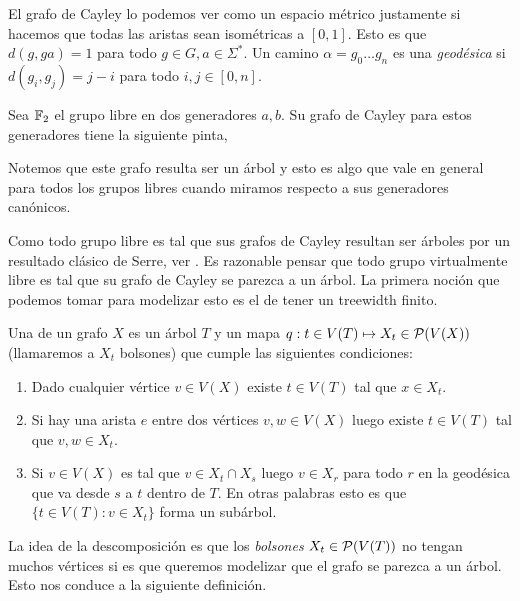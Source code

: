 \documentclass[tesis.tex]{subfiles}
\begin{document}
El grafo de Cayley lo podemos ver como un espacio métrico justamente si hacemos que todas las aristas sean isométricas a $[0,1]$. 
Esto es que $d(g,ga) = 1$ para todo $g \in G, a \in \Sigma^*$. 
Un camino $\alpha = g_0 \dots g_n$ es una \emph{geodésica} si $d(g_i,g_j) = j-i$ para todo $i,j \in [0,n]$.

\begin{ej}
	Sea $\Bbb F_2$ el grupo libre en dos generadores $a,b$. Su grafo de Cayley para estos generadores tiene la siguiente pinta,
	\bigskip
	
	
	 Notemos que este grafo resulta ser un árbol y esto es algo que vale en general para todos los grupos libres cuando miramos respecto a sus generadores canónicos.
\end{ej}

Como todo grupo libre es tal que sus grafos de Cayley resultan ser árboles por un resultado clásico de Serre, ver \cite{}.
Es razonable pensar que todo grupo virtualmente libre es tal que su grafo de Cayley se parezca a un árbol. 
La primera noción que podemos tomar para modelizar esto es el de tener un treewidth finito.

\begin{deff}\label{desc-arbol}
	 Una  de un grafo $X$ es un árbol $T$ y un mapa $q:t \in V(T) \mapsto X_t \in {\cal P}(V(X))$ (llamaremos a $X_t$ bolsones) que cumple las siguientes condiciones:
	\begin{enumerate}
		\item Dado cualquier vértice $v \in V(X)$ existe $t \in V(T)$ tal que $x \in X_t$. 
		\item Si hay una arista $e$ entre dos vértices $v,w \in V(X)$ luego existe $t \in V(T)$ tal que $v,w \in X_t$.
		\item Si $v \in V(X)$ es tal que $v \in X_t \cap X_s$ luego $v \in X_r$ para todo $r$ en la geodésica que va desde $s$ a $t$ dentro de $T$. En otras palabras esto es que $\{ t \in V(T) :  v \in X_t \}$ forma un subárbol. 
	\end{enumerate} 
\end{deff}
\smallskip

La idea de la descomposición es que los \emph{bolsones} $X_t \in {\cal P}(V(T))$ no tengan muchos vértices si es que queremos modelizar que el grafo se parezca a un árbol. Esto nos conduce a la siguiente definición.
\end{document}
